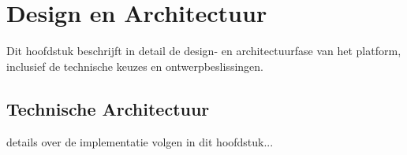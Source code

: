 \chapter{Design en Architectuur}
\label{ch:design}

Dit hoofdstuk beschrijft in detail de design- en architectuurfase van het platform, inclusief de technische keuzes en ontwerpbeslissingen.

\section{Technische Architectuur}
\label{sec:tech-architectuur}

details over de implementatie volgen in dit hoofdstuk...